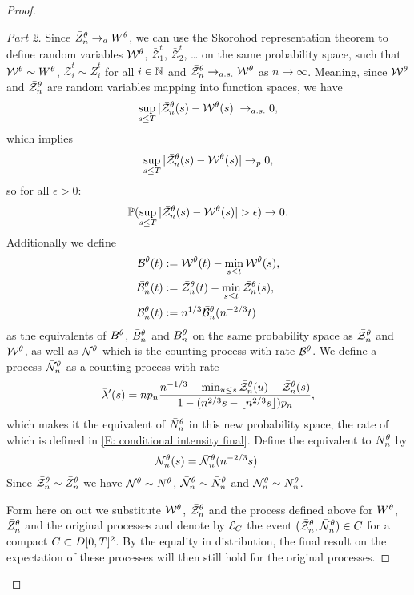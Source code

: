 \begin{proof}
\begin{proof}[Part 2]
Since $\bar{Z}^{\theta}_n \rightarrow_d W^{\theta}$, we can use the Skorohod representation theorem to define random variables 
$\mathcal{W}^{\theta}$, $\bar{\mathcal{Z}}^t_1$, $\bar{\mathcal{Z}}^t_2$, \dots
on the same probability space, such that $\mathcal{W}^{\theta} \sim W^{\theta}$, $\bar{\mathcal{Z}}^t_i \sim \bar{Z}^t_i$ for all $i \in \mathbb{N}$
and $\bar{\mathcal{Z}}^{\theta}_n \rightarrow_{a.s.} \mathcal{W}^{\theta}$ as $n \rightarrow \infty$.
Meaning, since $\mathcal{W}^{\theta}$ and $\bar{\mathcal{Z}}^{\theta}_n$ are random variables mapping into function spaces, we have
\begin{equation}
\sup_{s \leq T} |\bar{\mathcal{Z}}^{\theta}_n(s) - \mathcal{W}^{\theta}(s)| \rightarrow_{a.s.} 0,
\end{equation}
which  implies
\begin{equation} 
\sup_{s \leq T} |\bar{\mathcal{Z}}^{\theta}_n(s) - \mathcal{W}^{\theta}(s)| \rightarrow_p 0,
\end{equation}
so for all $\epsilon > 0$:
\begin{equation} \label{E: Prob(Event(delta)) 1}
\mathbb{P}( \sup_{s \leq T} |\bar{\mathcal{Z}}^{\theta}_n(s) - \mathcal{W}^{\theta}(s)| > \epsilon ) \rightarrow 0.
\end{equation}
Additionally we define \label{I: alt processes}
\begin{equation} 
	\begin{aligned}
	\mathcal{B}^{\theta}(t) &:= \mathcal{W}^{\theta}(t) - \min_{s \leq t}\mathcal{W}^{\theta}(s), \\
	\bar{\mathcal{B}}^{\theta}_n(t) &:= \bar{\mathcal{Z}}^{\theta}_n(t) - \min_{s \leq t}\bar{\mathcal{Z}}^{\theta}_n(s), \\
	\mathcal{B}_n^{\theta}(t) &:= n^{1 / 3}\bar{\mathcal{B}}^{\theta}_n(n^{-2 / 3}t)	
	\end{aligned}
\end{equation}
as the equivalents of $B^{\theta}$, $\bar{B}_n^{\theta}$ and $B_n^{\theta}$ on the same probability space as $\bar{\mathcal{Z}}^{\theta}_n$ and $\mathcal{W}^{\theta}$,
as well as $\mathcal{N}^{\theta}$ which is the counting process with rate $\mathcal{B}^{\theta}$.
We define a process $\bar{\mathcal{N}}_n^{\theta}$ as a counting process with rate
\begin{equation}
\bar{\lambda}'(s) = n p_n \frac{n^{-1 / 3} - \min_{u \leq s} \bar{\mathcal{Z}}^{\theta}_n(u) + \bar{\mathcal{Z}}^{\theta}_n(s)}{1 - (n^{2 / 3}s - \lfloor n^{2 / 3}s\rfloor)p_n},
\end{equation}
which makes it the equivalent of $\bar{N}_n^{\theta}$ in this new probability space, the rate of which is defined in \eqref{E: conditional intensity final}.
Define the equivalent to $N_n^{\theta}$ by 
\begin{equation}
	\mathcal{N}_n^{\theta}(s) = \bar{\mathcal{N}}_n^{\theta}(n^{-2 / 3}s).
\end{equation}
Since $\bar{\mathcal{Z}}^{\theta}_n \sim \bar{Z}^{\theta}_n$ we have $\mathcal{N}^{\theta} \sim N^{\theta}$, $\bar{\mathcal{N}}_n^{\theta} \sim \bar{N}_n^{\theta}$ and $\mathcal{N}_n^{\theta} \sim N_n^{\theta}$.

Form here on out we substitute $\mathcal{W}^{\theta}$, $\bar{\mathcal{Z}}^{\theta}_n$ and the process defined above for $W^{\theta}$, $\bar{Z}^{\theta}_n$ and the original processes
and denote by $\mathcal{E}_{C}$ the event $(\bar{\mathcal{Z}}^{\theta}_n, \bar{\mathcal{N}}_n^{\theta}) \in C$ for a compact $C \subset D[0, T]^2$.
By the equality in distribution, the final result on the expectation of these processes will then still hold for the original processes.


\end{proof}
\end{proof}
